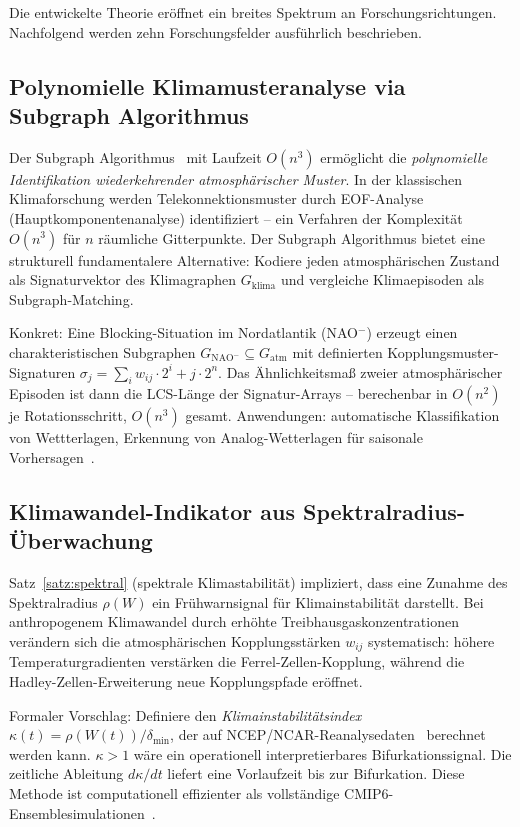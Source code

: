 ﻿\documentclass[a4paper,12pt]{article}
\theoremstyle{definition}
\begin{document}
Die entwickelte Theorie er\"offnet ein breites Spektrum an Forschungsrichtungen.
Nachfolgend werden zehn Forschungsfelder ausf\"uhrlich beschrieben.

\subsection{Polynomielle Klimamusteranalyse via Subgraph Algorithmus}

Der Subgraph Algorithmus~\cite{epp2026subgraph} mit Laufzeit $O(n^3)$ erm\"oglicht
die \emph{polynomielle Identifikation wiederkehrender atmosph\"arischer Muster}.
In der klassischen Klimaforschung werden Telekonnektionsmuster durch EOF-Analyse
(Hauptkomponentenanalyse) identifiziert -- ein Verfahren der Komplexit\"at $O(n^3)$
f\"ur $n$ r\"aumliche Gitterpunkte. Der Subgraph Algorithmus bietet eine strukturell
fundamentalere Alternative: Kodiere jeden atmosph\"arischen Zustand als Signaturvektor
des Klimagraphen $G_{\mathrm{klima}}$ und vergleiche Klimaepisoden als Subgraph-Matching.

Konkret: Eine Blocking-Situation im Nordatlantik (NAO$^-$) erzeugt einen charakteristischen
Subgraphen $G_{\mathrm{NAO}^-} \subseteq G_{\mathrm{atm}}$ mit definierten
Kopplungsmuster-Signaturen $\sigma_j = \sum_i w_{ij} \cdot 2^i + j \cdot 2^n$.
Das \"Ahnlichkeitsma{\ss} zweier atmosph\"arischer Episoden ist dann die LCS-L\"ange
der Signatur-Arrays -- berechenbar in $O(n^2)$ je Rotationsschritt, $O(n^3)$ gesamt.
Anwendungen: automatische Klassifikation von Wettterlagen, Erkennung von
Analog-Wetterlagen f\"ur saisonale Vorhersagen~\cite{barnett1987}.

\subsection{Klimawandel-Indikator aus Spektralradius-\"Uberwachung}

Satz~\ref{satz:spektral} (spektrale Klimastabilit\"at) impliziert, dass eine
Zunahme des Spektralradius $\rho(W)$ ein Fr\"uhwarnsignal f\"ur Klimainstabilit\"at
darstellt. Bei anthropogenem Klimawandel durch erh\"ohte Treibhausgaskonzentrationen
ver\"andern sich die atmosph\"arischen Kopplungsst\"arken $w_{ij}$ systematisch:
h\"ohere Temperaturgradienten verst\"arken die Ferrel-Zellen-Kopplung, w\"ahrend
die Hadley-Zellen-Erweiterung neue Kopplungspfade er\"offnet.

Formaler Vorschlag: Definiere den \emph{Klimainstabilit\"atsindex}
$\kappa(t) = \rho(W(t)) / \delta_{\min}$, der auf NCEP/NCAR-Reanalysedaten~\cite{kalnay1996}
berechnet werden kann. $\kappa > 1$ w\"are ein operationell interpretierbares
Bifurkationssignal. Die zeitliche Ableitung $d\kappa/dt$ liefert eine Vorlaufzeit
bis zur Bifurkation. Diese Methode ist computationell effizienter als vollst\"andige
CMIP6-Ensemblesimulationen~\cite{eyring2016}.
\end{document}
